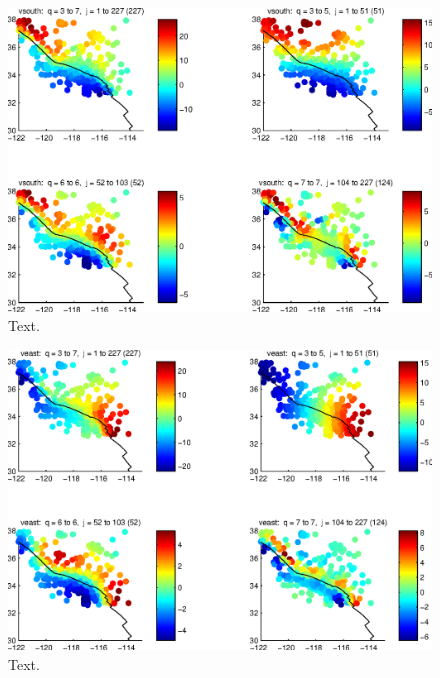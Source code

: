 \documentclass[11pt,titlepage,fleqn]{article}
\begin{document}
\begin{figure}
\includegraphics[width=16cm]{fig2D_B05.eps}
\caption[]
{{
Text.
\label{fig:2D_B03}
}}
\end{figure}

\begin{figure}
\includegraphics[width=16cm]{fig2D_B06.eps}
\caption[]
{{
Text.
\label{fig:2D_B03}
}}
\end{figure}
\end{document}
